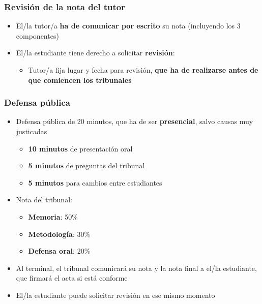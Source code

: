 \documentclass[aspectratio=43]{beamer}
\begin{document}
\begin{frame}
\frametitle{Revisión de la nota del tutor}
\centering

\begin{itemize}
  \item El/la tutor/a \textbf{ha de comunicar por escrito} su nota (incluyendo los 3 componentes)
  \item El/la estudiante tiene derecho a solicitar \textbf{revisión}:
  \begin{itemize}
    \item Tutor/a fija lugar y fecha para revisión, \textbf{que ha de realizarse antes de que comiencen los tribunales}
  \end{itemize}
\end{itemize}

\end{frame}

\begin{frame}
\frametitle{Defensa pública}
\centering

\begin{itemize}
  \item Defensa pública de 20 minutos, que ha de ser \textbf{presencial}, salvo causas muy justicadas
  \begin{itemize}
    \item \textbf{10 minutos} de presentación oral
    \item \textbf{5 minutos} de preguntas del tribunal
    \item \textbf{5 minutos} para cambios entre estudiantes
  \end{itemize}
  \item Nota del tribunal:
  \begin{itemize}
    \item \textbf{Memoria}: 50\%
    \item \textbf{Metodología}: 30\%
    \item \textbf{Defensa oral}: 20\%
  \end{itemize}
  \item Al terminal, el tribunal comunicará su nota y la nota final a el/la estudiante, que firmará el acta si está conforme
  \item El/la estudiante puede solicitar revisión en ese mismo momento
\end{itemize}

\end{frame}
\end{document}
